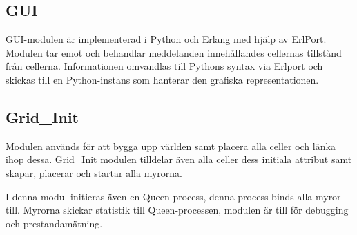 \subsection{GUI}

GUI-modulen är implementerad i Python och Erlang med hjälp av ErlPort. Modulen tar emot och behandlar meddelanden innehållandes cellernas tillstånd från cellerna. 
Informationen omvandlas till Pythons syntax via Erlport och skickas till en Python-instans som hanterar den grafiska representationen.

\subsection{Grid\_Init}

Modulen används för att bygga upp världen samt placera alla celler och länka ihop dessa. Grid\_Init modulen tilldelar även alla celler dess initiala attribut samt skapar, placerar och startar alla myrorna.

I denna modul initieras även en Queen-process, denna process binds alla myror till. Myrorna skickar statistik till Queen-processen, modulen är till för debugging och prestandamätning. 
